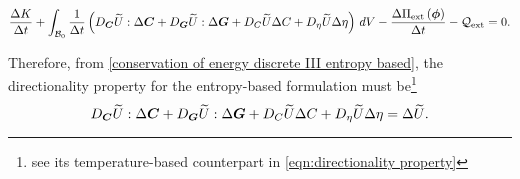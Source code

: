 %
\begin{equation}\label{conservation of energy discrete III entropy based}
\begin{aligned}
\frac{\Delta K}{\Delta t} + \int_{\mathcal{B}_0}\frac{1}{{\Delta t}}\left(D_{\vect{C}}\widetilde{U}:\Delta\vect{C} + D_{\vect{G}}\widetilde{U}:\Delta\vect{G} + D_C\widetilde{U}\Delta C + D_{\eta}\widetilde{U}\Delta\eta\right)\,dV
%
- \frac{\Delta\Pi_{\text{ext}}\left(\vect{\phi}\right)}{\Delta t} - \mathcal{Q}_{\text{ext}}= 0.
%
\end{aligned}
\end{equation}

Therefore, from \eqref{conservation of energy discrete III entropy based}, the directionality property for the entropy-based formulation must be\footnote{see its temperature-based counterpart in \eqref{eqn:directionality property}} 
%
\begin{equation}\label{eqn:directionality property entropy based}
D_{\vect{C}}\widetilde{U}:\Delta\vect{C} + 
D_{\vect{G}}\widetilde{U}:\Delta\vect{G} + 
D_{C}\widetilde{U}\Delta C  + D_{\eta}\widetilde{U}\Delta\eta =\Delta \widetilde{U}.
%
\end{equation}



